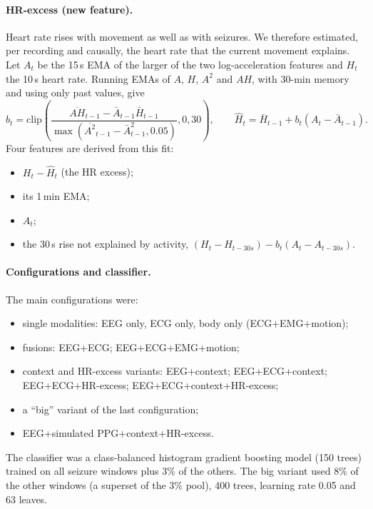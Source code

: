 \paragraph{HR-excess (new feature).} Heart rate rises with movement as well as with seizures. We therefore estimated, per recording and causally, the heart rate that the current movement explains. Let $A_t$ be the 15\,s EMA of the larger of the two log-acceleration features and $H_t$ the 10\,s heart rate. Running EMAs of $A$, $H$, $A^2$ and $AH$, with 30-min memory and using only past values, give
\begin{equation}
b_t = \mathrm{clip}\!\left(\frac{\overline{AH}_{t-1}-\bar A_{t-1}\bar H_{t-1}}{\max(\overline{A^2}_{t-1}-\bar A^2_{t-1},0.05)},0,30\right),\qquad
\hat H_t = \bar H_{t-1} + b_t(A_t - \bar A_{t-1}).
\end{equation}
Four features are derived from this fit:
\begin{itemize}
\item $H_t-\hat H_t$ (the HR excess);
\item its 1\,min EMA;
\item $A_t$;
\item the 30\,s rise not explained by activity, $(H_t-H_{t-30s}) - b_t(A_t-A_{t-30s})$.
\end{itemize}

\paragraph{Configurations and classifier.} The main configurations were:
\begin{itemize}
\item single modalities: EEG only, ECG only, body only (ECG+EMG+motion);
\item fusions: EEG+ECG; EEG+ECG+EMG+motion;
\item context and HR-excess variants: EEG+context; EEG+ECG+context; EEG+ECG+HR-excess; EEG+ECG+context+HR-excess;
\item a ``big'' variant of the last configuration;
\item EEG+simulated PPG+context+HR-excess.
\end{itemize}
The classifier was a class-balanced histogram gradient boosting model (150 trees) trained on all seizure windows plus 3\% of the others. The big variant used 8\% of the other windows (a superset of the 3\% pool), 400 trees, learning rate 0.05 and 63 leaves.

